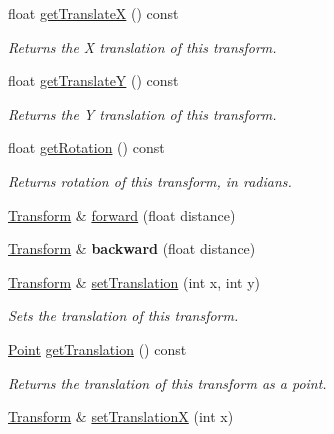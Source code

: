 \begin{DoxyCompactItemize}
float \hyperlink{classcturtle_1_1Transform_a341b1f4fe0055d1c27d3cbea61ef3788}{get\+TranslateX} () const
\begin{DoxyCompactList}\small\item\em Returns the X translation of this transform. \end{DoxyCompactList}\item 
float \hyperlink{classcturtle_1_1Transform_a9da2a0e256fdddbc0b5202c8d53a74bf}{get\+TranslateY} () const
\begin{DoxyCompactList}\small\item\em Returns the Y translation of this transform. \end{DoxyCompactList}\item 
float \hyperlink{classcturtle_1_1Transform_a1c879c9c239ca3a6af2d85c73b7e39b8}{get\+Rotation} () const
\begin{DoxyCompactList}\small\item\em Returns rotation of this transform, in radians. \end{DoxyCompactList}\item 
\hyperlink{classcturtle_1_1Transform}{Transform} \& \hyperlink{classcturtle_1_1Transform_ae0a81b79c7e737eadd880c20624acae3}{forward} (float distance)
\item 
\mbox{\label{classcturtle_1_1Transform_ae52b78a68ee2005d0479b0347414ca28}} 
\hyperlink{classcturtle_1_1Transform}{Transform} \& {\bfseries backward} (float distance)
\item 
\hyperlink{classcturtle_1_1Transform}{Transform} \& \hyperlink{classcturtle_1_1Transform_a99366b0667eab2ea5f4f194f8500f94a}{set\+Translation} (int x, int y)
\begin{DoxyCompactList}\small\item\em Sets the translation of this transform. \end{DoxyCompactList}\item 
\hyperlink{structcturtle_1_1ivec2}{Point} \hyperlink{classcturtle_1_1Transform_a1458bf240e11c44e32c9acc483406aec}{get\+Translation} () const
\begin{DoxyCompactList}\small\item\em Returns the translation of this transform as a point. \end{DoxyCompactList}\item 
\hyperlink{classcturtle_1_1Transform}{Transform} \& \hyperlink{classcturtle_1_1Transform_a1ce9955dd58f54a64e3c9277c82456d1}{set\+TranslationX} (int x)

\end{DoxyCompactItemize}
